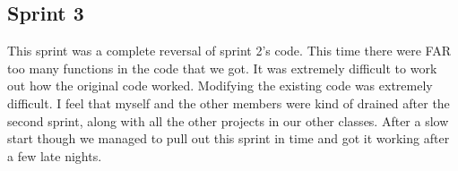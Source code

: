 \subsection{Sprint 3}
This sprint was a complete reversal of sprint 2's code. This time there were FAR too many functions in
the code that we got. It was extremely difficult to work out how the original code worked. Modifying the
existing code was extremely difficult. I feel that myself and the other members were kind of drained after
the second sprint, along with all the other projects in our other classes. After a slow start though we
managed to pull out this sprint in time and got it working after a few late nights.